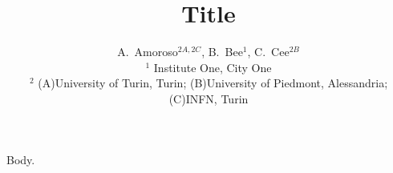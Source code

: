 \documentclass{article}
\title{Title}
\author{A.~Amoroso$^{2A,2C}$, B.~Bee$^{1}$, C.~Cee$^{2B}$\\
$^{1}$ Institute One, City One\\
$^{2}$ (A)University of Turin, Turin; (B)University of Piedmont, Alessandria; (C)INFN, Turin}
\begin{document}
\maketitle
Body.
\end{document}
